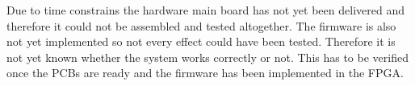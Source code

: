 Due to time constrains the hardware main board has not yet been delivered and therefore it could not be assembled and tested altogether. The firmware is also not yet implemented so not every effect could have been tested. Therefore it is not yet known whether the system works correctly or not. This has to be verified once the PCBs are ready and the firmware has been implemented in the FPGA. 